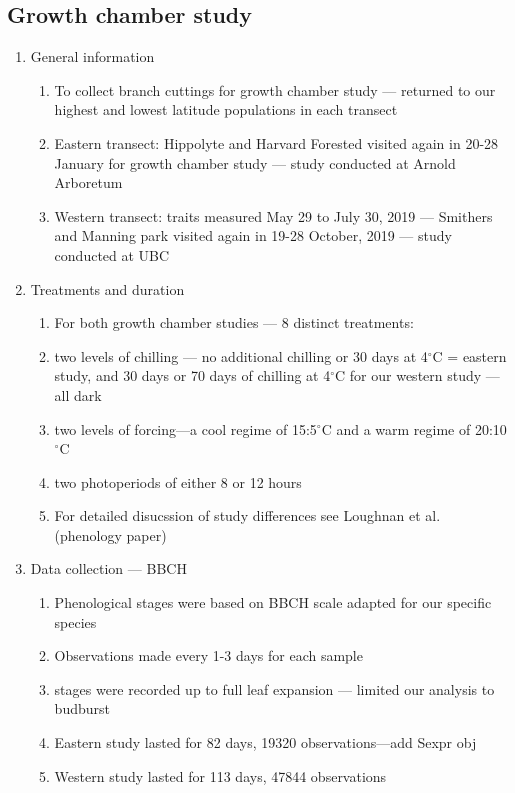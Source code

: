 \documentclass{article}
\begin{document}
\subsection*{Growth chamber study}
\begin{enumerate}
\item General information
\begin{enumerate}
\item To collect branch cuttings for growth chamber study --- returned to our highest and lowest latitude populations in each transect
\item Eastern transect: Hippolyte and Harvard Forested visited again in 20-28 January for growth chamber study --- study conducted at Arnold Arboretum
\item Western transect: traits measured May 29 to July 30, 2019 --- Smithers and Manning park visited again in 19-28 October, 2019 --- study conducted at UBC
\end{enumerate}

\item Treatments and duration
\begin{enumerate}
\item For both growth chamber studies --- 8 distinct treatments:
\item two levels of chilling --- no additional chilling or 30 days at 4$^{\circ}$C = eastern study, and 30 days or 70 days of chilling at 4$^{\circ}$C for our western study --- all dark
\item two levels of forcing—a cool regime of 15:5$^{\circ}$C and a warm regime of 20:10$^{\circ}$C
\item two photoperiods of either 8 or 12 hours
\item For detailed disucssion of study differences see Loughnan et al. (phenology paper)
\end{enumerate}

\item Data collection --- BBCH
\begin{enumerate}
\item Phenological stages were based on BBCH scale adapted for our specific species
\item Observations made every 1-3 days for each sample
\item stages were recorded up to full leaf expansion --- limited our analysis to budburst 
\item Eastern study lasted for 82 days, 19320 observations---add Sexpr obj
\item Western study lasted for 113 days, 47844 observations
\end{enumerate}

\end{enumerate}
\end{document}
